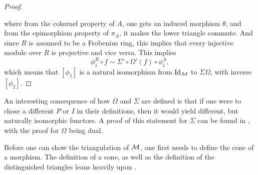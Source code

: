 \begin{proof}
\begin{center}
    \end{center}
    where from the cokernel property of \( A \), one gets an induced morphism \( \theta \), and from the epimorphism property of \( \pi_A \), it makes the lower triangle commute. And since \( R \) is assumed to be a Frobenius ring, this implies that every injective module over \( R \) is projective and vice versa. This implies
    \[
        \phi_1^B \circ f \sim \Sigma' \circ \Omega'(f) \circ \phi_1^A,
    \]
    which means that \( [\phi_1] \) is a natural isomorphism from \( \operatorname{Id}_{{\mathcal{M}}} \) to \( \Sigma \Omega \), with inverse \( [\phi_2] \).
\end{proof}

An interesting consequence of how \( \Omega \) and \( \Sigma \) are defined is that if one were to chose a different \( P \) or \( I \) in their definitions, then it would yield different, but naturally isomorphic functors. A proof of this statement for \( \Sigma \) can be found in \cite[Remark on p. 13]{Happel_1988}, with the proof for \( \Omega \) being dual.

Before one can show the triangulation of \( {\mathcal{M}} \), one first needs to define the cone of a morphism. The definition of a cone, as well as the definition of the distinguished triangles leans heavily upon \cite[Chapter 1, Subsection 2.5]{Happel_1988}.

